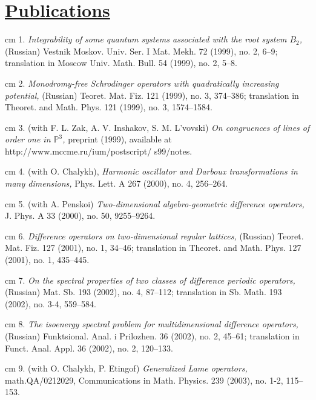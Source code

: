 \documentclass[11pt]{amsart}
\theoremstyle{plain}
\theoremstyle{definition}
\theoremstyle{remark}
\begin{document}



\section*{\Large\underline{Publications}}

\noindent{} cm 1.  {\it Integrability of some quantum
systems associated with the root system $B_2$,} (Russian) Vestnik
Moskov. Univ. Ser. I Mat. Mekh.  72 (1999), no. 2, 6--9;
        translation in Moscow Univ. Math. Bull. 54 (1999), no. 2, 5--8.

\noindent{} cm 2. {\it Monodromy-free Schrodinger
operators with quadratically increasing potential,} (Russian)
Teoret. Mat. Fiz. 121 (1999), no. 3, 374--386; translation in
Theoret. and Math. Phys. 121 (1999), no. 3, 1574--1584.

\noindent{} cm 3. (with F. L. Zak, A. V. Inshakov, S.
M. L'vovski) {\it On congruences of lines of order one in
$\mathbb{P}^3$,} preprint (1999), available at
http://www.mccme.ru/ium/postscript/ s99/notes.

\noindent{} cm 4. (with O.  Chalykh), {\it Harmonic
oscillator and Darboux transformations in many dimensions,} Phys.
Lett. A 267 (2000), no. 4, 256--264.

\noindent{} cm 5. (with  A.  Penskoi) {\it
Two-dimensional algebro-geometric difference operators,} J. Phys.
A 33 (2000), no. 50, 9255--9264.

\noindent{} cm 6. {\it Difference operators on
two-dimensional regular lattices,} (Russian) Teoret. Mat. Fiz. 127
(2001), no. 1, 34--46; translation in Theoret. and Math. Phys. 127
(2001), no. 1, 435--445.

\noindent{} cm 7. {\it On the spectral properties of
two classes of difference periodic operators,} (Russian) Mat. Sb.
193 (2002), no. 4, 87--112; translation in  Sb. Math.  193 (2002),
no. 3-4, 559--584.

\noindent{} cm 8. {\it The isoenergy spectral problem
for multidimensional difference operators,} (Russian) Funktsional.
Anal. i Prilozhen. 36 (2002), no. 2, 45--61;  translation in
Funct. Anal. Appl.  36  (2002),  no. 2, 120--133.

\noindent{} cm 9. (with O. Chalykh,   P. Etingof)
{\it  Generalized Lame operators,} math.QA/0212029, Communications
in Math. Physics. 239 (2003), no. 1-2, 115--153.
\end{document}
